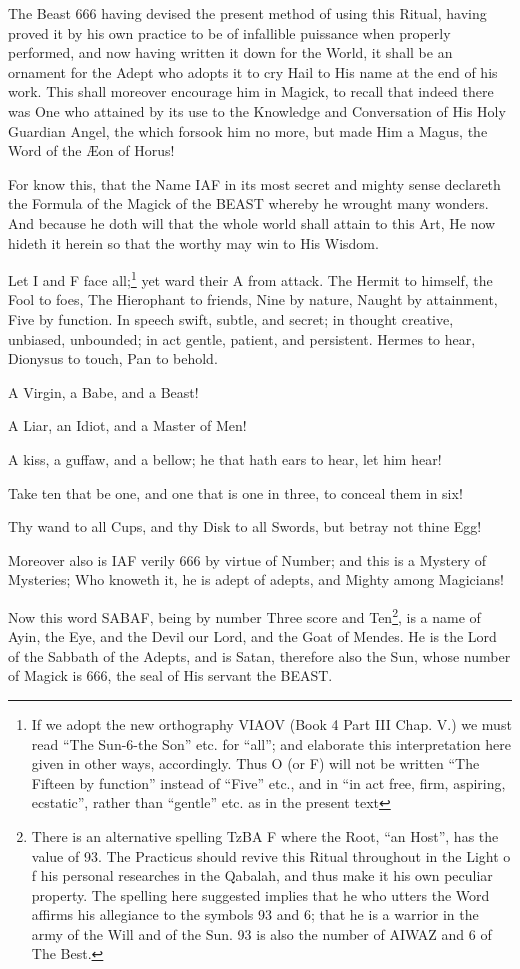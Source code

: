 The Beast 666 having devised the present method of using this Ritual, having proved it by his own practice to be of infallible puissance when properly performed, and now having written it down for the World, it shall be an ornament for the Adept who adopts it to cry Hail to His name at the end of his work. This shall moreover encourage him in Magick, to recall that indeed there was One who attained by its use to the Knowledge and Conversation of His Holy Guardian Angel, the which forsook him no more, but made Him a Magus, the Word of the \AE{}on of Horus!

For know this, that the Name IAF in its most secret and mighty sense declareth the Formula of the Magick of the BEAST whereby he wrought many wonders. And because he doth will that the whole world shall attain to this Art, He now hideth it herein so that the worthy may win to His Wisdom.

Let I and F face all;\footnote{If we adopt the new orthography VIAOV (Book 4 Part III Chap. V.) we must read \enquote{The Sun-6-the Son} etc. for \enquote{all}; and elaborate this interpretation here given in other ways, accordingly. Thus O (or F) will not be written \enquote{The Fifteen by function} instead of \enquote{Five} etc., and in \enquote{in act free, firm, aspiring, ecstatic}, rather than \enquote{gentle} etc. as in the present text} yet ward their A from attack. The Hermit to himself, the Fool to foes, The Hierophant to friends, Nine by nature, Naught by attainment, Five by function. In speech swift, subtle, and secret; in thought creative, unbiased, unbounded; in act gentle, patient, and persistent. Hermes to hear, Dionysus to touch, Pan to behold.

A Virgin, a Babe, and a Beast!

A Liar, an Idiot, and a Master of Men!

A kiss, a guffaw, and a bellow; he that hath ears to hear, let him hear!

Take ten that be one, and one that is one in three, to conceal them in six!

Thy wand to all Cups, and thy Disk to all Swords, but betray not thine Egg!

Moreover also is IAF verily 666 by virtue of Number; and this is a Mystery of Mysteries; Who knoweth it, he is adept of adepts, and Mighty among Magicians!

Now this word SABAF, being by number Three score and Ten\footnote{There is an alternative spelling TzBA \textemdash{} F where the Root, \enquote{an Host}, has the value of 93. The Practicus should revive this Ritual throughout in the Light o f his personal researches in the Qabalah, and thus make it his own peculiar property. The spelling here suggested implies that he who utters the Word affirms his allegiance to the symbols 93 and 6; that he is a warrior  in the army of the Will and of the Sun. 93 is also the number of AIWAZ and 6 of The Best.}, is a name of Ayin, the Eye, and the Devil our Lord, and the Goat of Mendes. He is the Lord of the Sabbath of the Adepts, and is Satan, therefore also the Sun, whose number of Magick is 666, the seal of His servant the BEAST.

